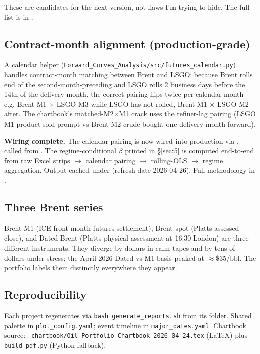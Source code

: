 \documentclass[10pt,a4paper]{article}
\begin{document}
These are candidates for the next version, not flaws I'm trying to hide. The full list is in .

\subsection{Contract-month alignment (production-grade)}

A calendar helper (\texttt{Forward\_Curves\_Analysis/src/futures\_calendar.py}) handles contract-month matching between Brent and \mbox{LSGO}: because Brent rolls end of the second-month-preceding and \mbox{LSGO} rolls 2 business days before the 14th of the delivery month, the correct pairing flips twice per calendar month --- e.g. Brent M1 $\times$ \mbox{LSGO} M3 while \mbox{LSGO} has not rolled, Brent M1 $\times$ \mbox{LSGO} M2 after. The chartbook's matched-M2$\times$M1 crack uses the refiner-lag pairing (LSGO M1 product sold prompt vs Brent M2 crude bought one delivery month forward).

\textbf{Wiring complete.} The calendar pairing is now wired into production via , called from . The regime-conditional $\beta$ printed in \S\ref{sec:5} is computed end-to-end from raw Excel strips $\rightarrow$ calendar pairing $\rightarrow$ rolling-OLS $\rightarrow$ regime aggregation. Output cached under  (refresh date 2026-04-26). Full methodology in .

\subsection{Three Brent series}

Brent M1 (ICE front-month futures settlement), Brent spot (Platts assessed close), and Dated Brent (Platts physical assessment at 16:30 London) are three different instruments. They diverge by dollars in calm tapes and by tens of dollars under stress; the April 2026 Dated-vs-M1 basis peaked at $\approx$\$35/bbl. The portfolio labels them distinctly everywhere they appear.

\subsection{Reproducibility}

Each project regenerates via \texttt{bash generate\_reports.sh} from its folder. Shared palette in \texttt{plot\_config.yaml}; event timeline in \texttt{major\_dates.yaml}. Chartbook source: \texttt{\_chartbook/Oil\_Portfolio\_Chartbook\_2026-04-24.tex} (LaTeX) plus \texttt{build\_pdf.py} (Python fallback).
\end{document}
